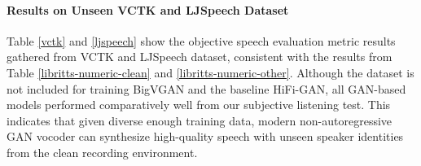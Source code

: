 \documentclass{article} \usepackage{iclr2023_conference,times}
\theoremstyle{plain}
\theoremstyle{definition}
\theoremstyle{remark}
\begin{document}
\paragraph{Results on Unseen VCTK and LJSpeech Dataset}
Table \ref{vctk} and \ref{ljspeech} show the objective speech evaluation metric results gathered from VCTK and LJSpeech dataset, consistent with the results from Table \ref{libritts-numeric-clean} and \ref{libritts-numeric-other}. Although the dataset is not included for training BigVGAN and the baseline HiFi-GAN, all GAN-based models performed comparatively well from our subjective listening test. This indicates that given diverse enough training data, modern non-autoregressive GAN vocoder can synthesize high-quality speech with unseen speaker identities from the clean recording environment.
\end{document}
